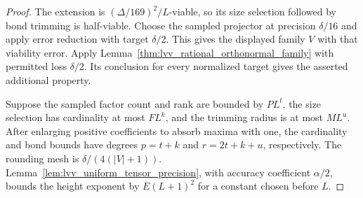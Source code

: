 \begin{proof}
    \leanok
    The extension is $(\Delta/169)^2/L$-viable, so its size selection
    followed by bond trimming is half-viable. Choose the sampled
    projector at precision $\delta/16$ and apply error reduction with
    target $\delta/2$. This gives the displayed family $V$ with that
    viability error. Apply Lemma~\ref{thm:lvv_rational_orthonormal_family}
    with permitted loss $\delta/2$. Its conclusion for every normalized
    target gives the asserted additional property.

    Suppose the sampled factor count and rank are bounded by $PL^t$,
    the size selection has cardinality at most $FL^k$, and the trimming
    radius is at most $ML^u$. After enlarging positive coefficients to
    absorb maxima with one, the cardinality and bond bounds have degrees
    $p=t+k$ and $r=2t+k+u$, respectively. The rounding mesh is
    $\delta/(4(|V|+1))$.
    Lemma~\ref{lem:lvv_uniform_tensor_precision}, with accuracy coefficient
    $\alpha/2$, bounds the height exponent by $E(L+1)^2$ for a constant
    chosen before $L$.
\end{proof}

